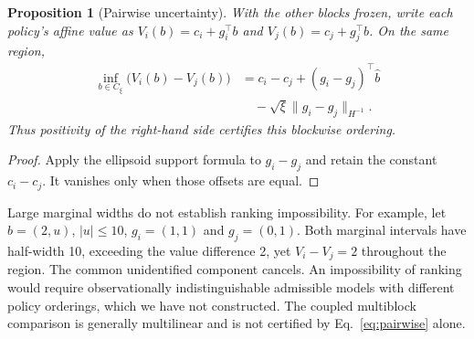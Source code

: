 \documentclass[11pt]{article}
\newtheorem{proposition}{Proposition}
\begin{document}
\begin{proposition}[Pairwise uncertainty]
With the other blocks frozen, write each policy's affine value as
$V_i(b)=c_i+g_i^\top b$ and $V_j(b)=c_j+g_j^\top b$.
On the same region,
\begin{equation}
 \begin{aligned}
 \inf_{b\in C_\xi}\bigl(V_i(b)-V_j(b)\bigr)
 &=c_i-c_j+(g_i-g_j)^\top\hat b\\
 &\quad-\sqrt\xi\|g_i-g_j\|_{H^{-1}}.
 \end{aligned}
 \label{eq:pairwise}
\end{equation}
Thus positivity of the right-hand side certifies this blockwise ordering.
\end{proposition}
\begin{proof}
Apply the ellipsoid support formula to $g_i-g_j$ and retain the constant
$c_i-c_j$. It vanishes only when those offsets are equal.
\end{proof}

Large marginal widths do not establish ranking impossibility. For example,
let $b=(2,u)$, $|u|\le10$, $g_i=(1,1)$ and $g_j=(0,1)$.
Both marginal intervals have half-width 10, exceeding the value difference 2,
yet $V_i-V_j=2$ throughout the region. The common unidentified component
cancels. An impossibility of ranking would require observationally
indistinguishable admissible models with different policy orderings, which we
have not constructed. The coupled multiblock comparison is generally
multilinear and is not certified by Eq.~\eqref{eq:pairwise} alone.
\end{document}
